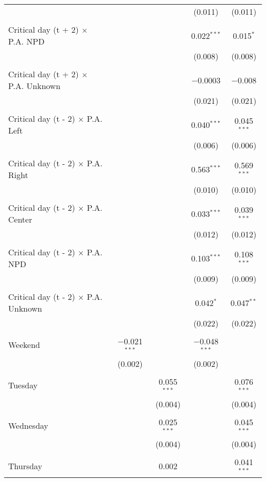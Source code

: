 \documentclass[
]{article}
\begin{document}
\begin{table}[!htbp]
{\begin{tabular}{@{\extracolsep{5pt}}lcccc}
  &  &  & (0.011) & (0.011) \\ 
  & & & & \\ 
 Critical day (t + 2) $\times$ P.A. NPD &  &  & 0.022$^{***}$ & 0.015$^{*}$ \\ 
  &  &  & (0.008) & (0.008) \\ 
  & & & & \\ 
 Critical day (t + 2) $\times$ P.A. Unknown &  &  & $-$0.0003 & $-$0.008 \\ 
  &  &  & (0.021) & (0.021) \\ 
  & & & & \\ 
 Critical day (t - 2) $\times$ P.A. Left &  &  & 0.040$^{***}$ & 0.045$^{***}$ \\ 
  &  &  & (0.006) & (0.006) \\ 
  & & & & \\ 
 Critical day (t - 2) $\times$ P.A. Right &  &  & 0.563$^{***}$ & 0.569$^{***}$ \\ 
  &  &  & (0.010) & (0.010) \\ 
  & & & & \\ 
 Critical day (t - 2) $\times$ P.A. Center &  &  & 0.033$^{***}$ & 0.039$^{***}$ \\ 
  &  &  & (0.012) & (0.012) \\ 
  & & & & \\ 
 Critical day (t - 2) $\times$ P.A. NPD &  &  & 0.103$^{***}$ & 0.108$^{***}$ \\ 
  &  &  & (0.009) & (0.009) \\ 
  & & & & \\ 
 Critical day (t - 2) $\times$ P.A. Unknown &  &  & 0.042$^{*}$ & 0.047$^{**}$ \\ 
  &  &  & (0.022) & (0.022) \\ 
  & & & & \\ 
 Weekend & $-$0.021$^{***}$ &  & $-$0.048$^{***}$ &  \\ 
  & (0.002) &  & (0.002) &  \\ 
  & & & & \\ 
 Tuesday &  & 0.055$^{***}$ &  & 0.076$^{***}$ \\ 
  &  & (0.004) &  & (0.004) \\ 
  & & & & \\ 
 Wednesday &  & 0.025$^{***}$ &  & 0.045$^{***}$ \\ 
  &  & (0.004) &  & (0.004) \\ 
  & & & & \\ 
 Thursday &  & 0.002 &  & 0.041$^{***}$ \\ 

\end{tabular}}
\end{table}
\end{document}
